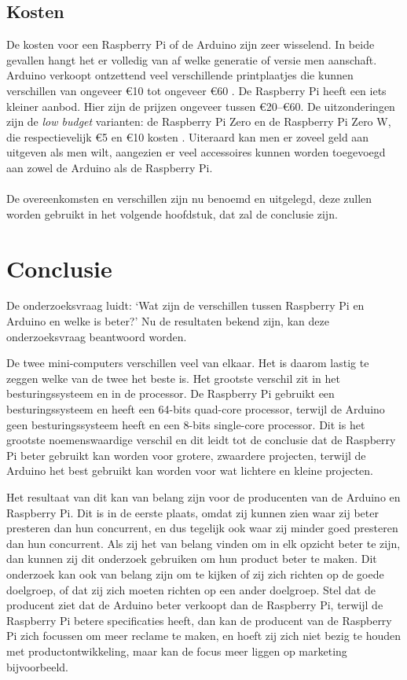 \documentclass[a4paper, dutch, abstract=true]{scrartcl}
\begin{document}
\subsection{Kosten}
De kosten voor een Raspberry Pi of de Arduino zijn zeer wisselend.
In beide gevallen hangt het er volledig van af welke generatie of versie men aanschaft.
Arduino verkoopt ontzettend veel verschillende printplaatjes die kunnen verschillen van ongeveer
\euro10 tot ongeveer \euro60 \cite{arduino2019arduino}.
De Raspberry Pi heeft een iets kleiner aanbod.
Hier zijn de prijzen ongeveer tussen \euro20--\euro60.
De uitzonderingen zijn de \emph{low budget} varianten: de Raspberry Pi Zero en de Raspberry Pi Zero W, die
respectievelijk \euro5 en \euro10 kosten \cite{kiwi2019zoeken}.
Uiteraard kan men er zoveel geld aan uitgeven als men wilt, aangezien er veel accessoires kunnen
worden toegevoegd aan zowel de Arduino als de Raspberry Pi.

\paragraph*{}
De overeenkomsten en verschillen zijn nu benoemd en uitgelegd, deze zullen worden gebruikt in het
volgende hoofdstuk, dat zal de conclusie zijn.

\section{Conclusie}
De onderzoeksvraag luidt: `Wat zijn de verschillen tussen Raspberry Pi en Arduino en welke is
beter?'
Nu de resultaten bekend zijn, kan deze onderzoeksvraag beantwoord worden.

De twee mini-computers verschillen veel van elkaar.
Het is daarom lastig te zeggen welke van de twee het beste is.
Het grootste verschil zit in het besturingssysteem en in de processor.
De Raspberry Pi gebruikt een besturingssysteem en heeft een 64-bits quad-core processor, terwijl de
Arduino geen besturingssysteem heeft en een 8-bits single-core processor.
Dit is het grootste noemenswaardige verschil en dit leidt tot de conclusie dat de Raspberry Pi beter
gebruikt kan worden voor grotere, zwaardere projecten, terwijl de Arduino het best gebruikt kan
worden voor wat lichtere en kleine projecten.

Het resultaat van dit kan van belang zijn voor de producenten van de Arduino en Raspberry Pi.
Dit is in de eerste plaats, omdat zij kunnen zien waar zij beter presteren dan hun concurrent, en
dus tegelijk ook waar zij minder goed presteren dan hun concurrent.
Als zij het van belang vinden om in elk opzicht beter te zijn, dan kunnen zij dit onderzoek
gebruiken om hun product beter te maken.
Dit onderzoek kan ook van belang zijn om te kijken of zij zich richten op de goede doelgroep, of dat
zij zich moeten richten op een ander doelgroep.
Stel dat de producent ziet dat de Arduino beter verkoopt dan de Raspberry Pi, terwijl de Raspberry
Pi betere specificaties heeft, dan kan de producent van de Raspberry Pi zich focussen om meer
reclame te maken, en hoeft zij zich niet bezig te houden met productontwikkeling, maar kan de focus
meer liggen op marketing bijvoorbeeld.
\end{document}
